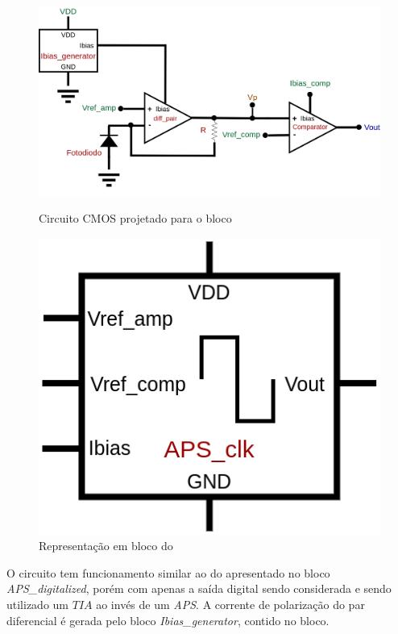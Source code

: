 \begin{figure}[htb]
 \centering
    \centering
    \caption{Circuito CMOS projetado para o bloco \NomeBloco} 
    \includegraphics[scale=0.3]{Circuitos/APS_clk.png}
    \label{\NomePFig}
\end{figure}

\begin{figure}[htb]
 \centering
    \centering
    \caption{Representa{\c c}\~ao em bloco do \NomeBloco} \label{\NomeSFig}
    \includegraphics[scale=0.3]{Circuitos/APS_clk_block.png}
\end{figure}

O circuito tem funcionamento similar ao do apresentado no bloco \emph{APS\_digitalized}, por\'em com apenas a sa\'ida digital sendo considerada e sendo utilizado um $TIA$ ao inv\'es de um \emph{APS}. A corrente de polariza{\c c}\~ao do par diferencial \'e gerada pelo bloco \emph{Ibias\_generator}, contido no bloco.


